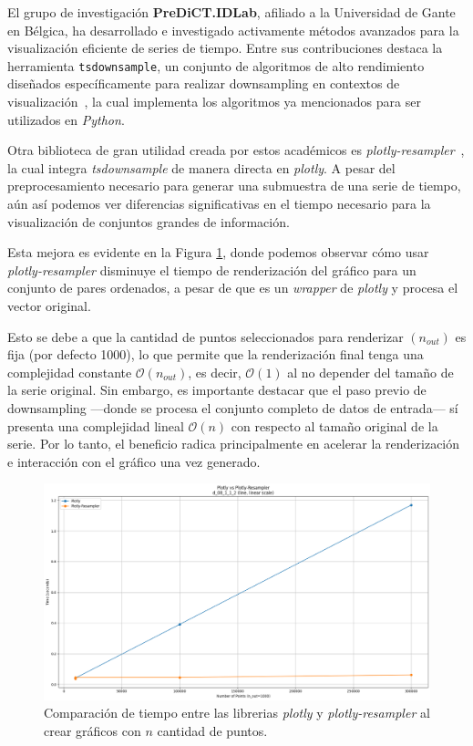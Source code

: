 El grupo de investigación \textbf{PreDiCT.IDLab}\cite{predict2025}, afiliado a la Universidad de Gante en Bélgica, ha desarrollado e investigado activamente métodos avanzados para la visualización eficiente de series de tiempo. Entre sus contribuciones destaca la herramienta \texttt{tsdownsample}, un conjunto de algoritmos de alto rendimiento diseñados específicamente para realizar downsampling en contextos de visualización~\cite{tsdownsample}, la cual implementa los algoritmos ya mencionados para ser utilizados en \textit{Python}.

Otra biblioteca de gran utilidad creada por estos académicos es \textit{plotly-resampler}~\cite{plotly-resampler}, la cual integra \textit{tsdownsample} de manera directa en \textit{plotly}. A pesar del preprocesamiento necesario para generar una submuestra de una serie de tiempo, aún así podemos ver diferencias significativas en el tiempo necesario para la visualización de conjuntos grandes de información.

Esta mejora es evidente en la Figura \ref{plotly_vs_resampler}, donde podemos observar cómo usar \textit{plotly-resampler} disminuye el tiempo de renderización del gráfico para un conjunto de pares ordenados, a pesar de que es un \textit{wrapper} de \textit{plotly} y procesa el vector original. 

Esto se debe a que la cantidad de puntos seleccionados para renderizar $(n_{out})$ es fija (por defecto 1000), lo que permite que la renderización final tenga una complejidad constante $\mathcal{O}(n_{out})$, es decir, $\mathcal{O}(1)$ al no depender del tamaño de la serie original. Sin embargo, es importante destacar que el paso previo de downsampling —donde se procesa el conjunto completo de datos de entrada— sí presenta una complejidad lineal $\mathcal{O}(n)$ con respecto al tamaño original de la serie. Por lo tanto, el beneficio radica principalmente en acelerar la renderización e interacción con el gráfico una vez generado.


\begin{figure}[H]
    \centering
    \includegraphics[width=0.9\linewidth]{introduction/images/plotly_resampler.png}
    \caption[Tiempo de Renderizado Plotly vs Plotly-Resampler]{Comparación de tiempo entre las librerias \textit{plotly} y \textit{plotly-resampler} al crear gráficos con $n$ cantidad de puntos.}
    \label{plotly_vs_resampler}
\end{figure}

